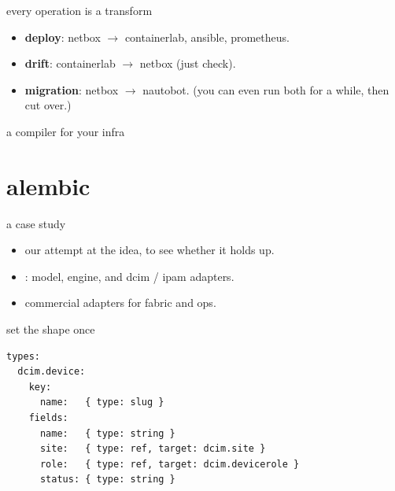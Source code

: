  \begin{frame}{every operation is a transform}
    \begin{itemize}
      \item \textbf{deploy}: netbox $\to$ containerlab, ansible, prometheus.
			\item \textbf{drift}: containerlab $\to$ netbox (just check).
			\item \textbf{migration}: netbox $\to$ nautobot. (you can even run both for a while,
				then cut over.)
    \end{itemize}
  \end{frame}

  \begin{frame}{a compiler for your infra}
  \end{frame}

  \section{alembic}
  \begin{frame}{a case study}
    \begin{itemize}
      \item our attempt at the idea, to see whether it holds up.
      \item {}: model, engine, and dcim / ipam adapters.
      \item commercial adapters for fabric and ops.
    \end{itemize}
  \end{frame}

  \begin{frame}[fragile]{set the shape once}
    \vfill
\begin{lstlisting}
types:
  dcim.device:
    key:
      name:   { type: slug }
    fields:
      name:   { type: string }
      site:   { type: ref, target: dcim.site }
      role:   { type: ref, target: dcim.devicerole }
      status: { type: string }
\end{lstlisting}
    \vfill
  \end{frame}

